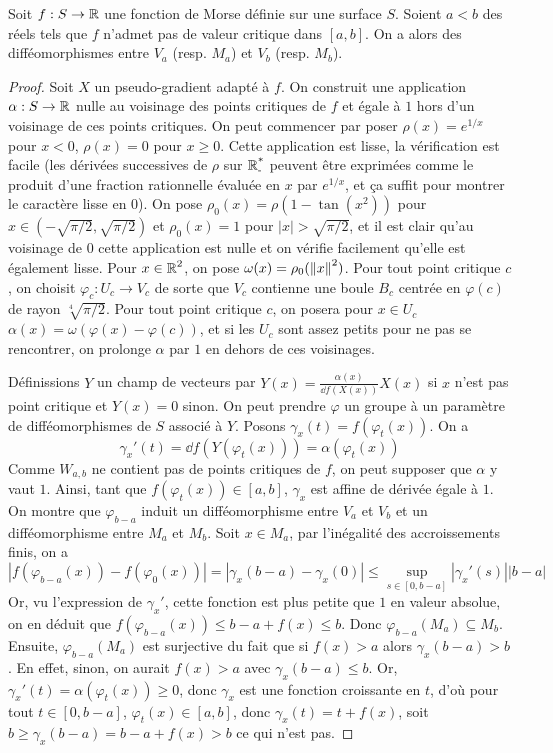 \begin{thm}
    Soit $f:S\to\operatorname{\mathbb R}$ une fonction de Morse définie sur une surface $S$.
    Soient $a<b$ des réels tels que $f$ n'admet pas de valeur critique dans $[a,b]$.
    On a alors des difféomorphismes entre $V_a$ (resp. $M_a$) et $V_b$ (resp. $M_b$).
\end{thm}

\begin{proof}
    Soit $X$ un pseudo-gradient adapté à $f$. 
    On construit une application $\alpha:S\to\operatorname{\mathbb R}$ nulle au voisinage des points critiques 
    de $f$ et  égale à $1$ hors d'un voisinage de ces points critiques.
    On peut commencer par poser $\rho(x)=e^{1/x}$ pour $x<0$, $\rho(x)=0$ pour $x\geq 0$. 
    Cette application est lisse, la vérification est facile (les dérivées successives de 
    $\rho$ sur $\operatorname{\mathbb R_-^*}$ peuvent être exprimées comme le produit d'une fraction rationnelle 
    évaluée en $x$ par $e^{1/x}$, et ça suffit pour montrer le caractère lisse en $0$).
    On pose $\rho_0(x)=\rho(1-\tan(x^2))$ pour $x\in(-\sqrt{\pi/2},\sqrt{\pi/2})$ et 
    $\rho_0(x)=1$ pour $|x|>\sqrt{\pi/2}$, et il est clair qu'au voisinage de $0$ cette 
    application est nulle et on vérifie facilement qu'elle est également lisse. 
    Pour $x\in\operatorname{\mathbb R}^2$, on pose $\omega(x)=\rho_0(\left\lVert x\right\rVert^2)$.
    Pour tout point critique $c$, on choisit $\varphi_c:U_c\to V_c$ de sorte que $V_c$ 
    contienne une boule $B_c$ centrée en $\varphi(c)$ de rayon $\sqrt[4]{\pi/2}$.
    Pour tout point critique $c$, on posera pour $x\in U_c$ 
    $\alpha(x)=\omega(\varphi(x)-\varphi(c))$, et si les $U_c$ sont assez petits pour
    ne pas se rencontrer, on prolonge $\alpha$ par $1$ en dehors de ces voisinages.

    Définissions $Y$ un champ de vecteurs par $Y(x)=\frac{\alpha(x)}{\dd f(X(x))}X(x)$ si 
    $x$ n'est pas point critique et $Y(x)=0$ sinon.
    On peut prendre $\varphi$ un groupe à un paramètre de difféomorphismes de $S$ associé à 
    $Y$. 
    Posons $\gamma_x(t)=f(\varphi_t(x))$.
    On a 
    \[
        \gamma_x'(t)=\dd f(Y(\varphi_t(x)))=\alpha(\varphi_t(x))
    \]
    Comme $W_{a,b}$ ne contient pas de points critiques de $f$, on peut supposer que $\alpha$ 
    y vaut $1$.
    Ainsi, tant que $f(\varphi_t(x))\in[a,b]$, $\gamma_x$ est affine de dérivée égale à $1$.
    On montre que $\varphi_{b-a}$ induit un difféomorphisme entre $V_a$ et $V_b$ et un 
    difféomorphisme entre $M_a$ et $M_b$. 
    Soit $x\in M_a$, par l'inégalité des accroissements finis, on a 
    \[
        |f(\varphi_{b-a}(x))-f(\varphi_0(x))|=
        |\gamma_x(b-a)-\gamma_x(0)|\leq \sup_{s\in[0,b-a]}|\gamma_x'(s)||b-a|
    \]
    Or, vu l'expression de $\gamma_x'$, cette fonction est plus petite que $1$ en valeur absolue, 
    on en déduit que $f(\varphi_{b-a}(x))\leq b-a+f(x)\leq b$.
    Donc $\varphi_{b-a}(M_a)\subseteq M_b$. 
    Ensuite, $\varphi_{b-a}(M_a)$ est surjective du fait que si $f(x)>a$ alors $\gamma_x(b-a)>b$. 
    En effet, sinon, on aurait $f(x)>a$ avec $\gamma_x(b-a)\leq b$. 
    Or, $\gamma_x'(t)=\alpha(\varphi_t(x))\geq 0$,
    donc $\gamma_x$ est une fonction croissante en $t$, d'où pour tout $t\in[0,b-a]$, 
    $\varphi_t(x)\in[a,b]$, donc $\gamma_x(t)=t+f(x)$, soit $b\geq \gamma_x(b-a)=b-a+f(x)>b$ 
    ce qui n'est pas.


\end{proof}
